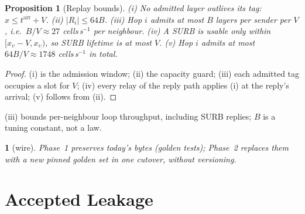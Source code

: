 \documentclass[journal]{IEEEtran}
\newtheorem{proposition}{Proposition}
\newcommand{\namedhead}{}
\newtheorem*{namedenv}{\namedhead}
\newenvironment{lawL}[2]{\renewcommand{\namedhead}{Law #1}%
  \begin{namedenv}[#2]}{\end{namedenv}}
\newcommand{\arr}{t^{\mathrm{arr}}}
\begin{document}
\begin{proposition}[Replay bounds]\label{prop:replay}
(i) No admitted layer outlives its tag: $x\le\arr+V$.  (ii) $|R_i|\le64B$.
(iii) Hop $i$ admits at most $B$ layers per sender per $V$, i.e.\
$B/V\approx27$ cells\,s$^{-1}$ per neighbour.  (iv) A SURB is usable
only within $[x_\upsilon-V,x_\upsilon)$, so SURB lifetime is at most $V$.
(v) Hop $i$ admits at most $64B/V\approx1748$ cells\,s$^{-1}$ in total.
\end{proposition}
\begin{proof}
(i) is the admission window; (ii) the capacity guard; (iii) each admitted
tag occupies a slot for $V$; (iv) every relay of the reply path applies
(i) at the reply's arrival; (v) follows from (ii).
\end{proof}

(iii) bounds per-neighbour loop throughput, including SURB replies; $B$
is a tuning constant, not a law.

\begin{lawL}{L10}{wire}
Phase~1 preserves today's bytes (golden tests); Phase~2 replaces them with
a new pinned golden set in one cutover, without versioning.
\end{lawL}

\section{Accepted Leakage}\label{sec:leak}
\end{document}
